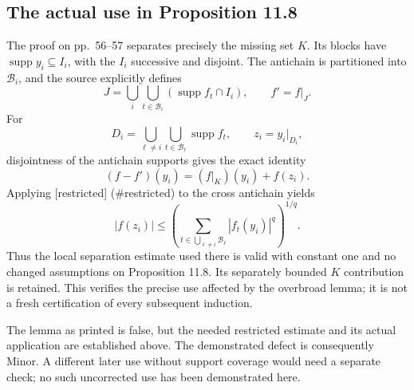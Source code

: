 \documentclass[10pt]{article}
\begin{document}
\subsection*{The actual use in Proposition 11.8}
The proof on pp. 56–57 separates precisely the missing set \(K\). Its blocks have \(\operatorname{supp}y_i\subseteq I_i\), with the \(I_i\) successive and disjoint. The antichain is partitioned into \(\mathcal B_i\), and the source explicitly defines \[J=\bigcup_i\bigcup_{t\in\mathcal B_i}(\operatorname{supp}f_t\cap I_i),
 \qquad f'=f|_J.\] For \[D_i=\bigcup_{\ell\ne i}\bigcup_{t\in\mathcal B_\ell}\operatorname{supp}f_t,
 \qquad z_i=y_i|_{D_i},\] disjointness of the antichain supports gives the exact identity \[(f-f')(y_i)=(f|_K)(y_i)+f(z_i).\] Applying [restricted] (\#restricted) to the cross antichain yields \[|f(z_i)|\leq
 \left(\sum_{t\in\bigcup_{\ell\ne i}\mathcal B_\ell}
                    |f_t(y_i)|^q\right)^{1/q}.\] Thus the local separation estimate used there is valid with constant one and no changed assumptions on Proposition 11.8. Its separately bounded \(K\) contribution is retained. This verifies the precise use affected by the overbroad lemma; it is not a fresh certification of every subsequent induction.\par
The lemma as printed is false, but the needed restricted estimate and its actual application are established above. The demonstrated defect is consequently Minor. A different later use without support coverage would need a separate check; no such uncorrected use has been demonstrated here.\par
\end{document}
